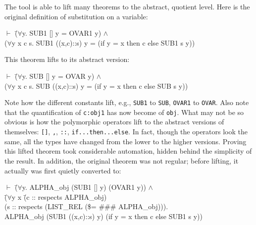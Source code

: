 \documentclass[envcountsame,runningheads]{llncs}
\begin{document}
The tool is able to lift many theorems to the abstract, quotient level.
Here is the original definition of substitution on a variable:
{\tt \begin{tabbing}
$\vdash$ \=($\forall$y. SUB1 [] y = OVAR1 y) $\wedge$ \\
\> ($\forall$y x c s. SUB1 ((x,c)::s) y = (if y = x then c else SUB1 s y))
\end{tabbing}}
This theorem lifts to its abstract version:
{\tt \begin{tabbing}
$\vdash$ \=($\forall$y. SUB [] y = OVAR y) $\wedge$ \\
\> ($\forall$y x c s. SUB ((x,c)::s) y = (if y = x then c else SUB s y))
\end{tabbing}}
Note how the different constants lift, e.g., {\tt SUB1} to {\tt SUB},
{\tt OVAR1} to {\tt OVAR}.  Also note that the quantification of 
{\tt c:obj1} has now become of {\tt obj}.
What may not be so obvious is how the
polymorphic operators lift to the abstract versions of themselves:
{\tt []}, {\tt ,}, {\tt ::}, {\tt if...then...else}.
In fact, though the operators look the same, all the types have changed
from the lower to the higher versions.
Proving this lifted theorem took considerable automation,
hidden behind
the simplicity of the result.
In addition, the original theorem was not regular; before lifting,
it actually was first quietly converted to:
{\tt \begin{tabbing}
$\vdash$ \=($\forall$y. ALPHA\_obj (SUB1 [] y) (OVAR1 y)) $\wedge$ \\
\>   (\=$\forall$y x \=(c :: respects ALPHA\_obj) \\
\>\>\> (s :: respects (LIST\_REL (\$= \#\#\# ALPHA\_obj))). \\
\>\>  ALPHA\_obj (SUB1 ((x,c)::s) y) (if y = x then c else SUB1 s y))
\end{tabbing}}
\end{document}
